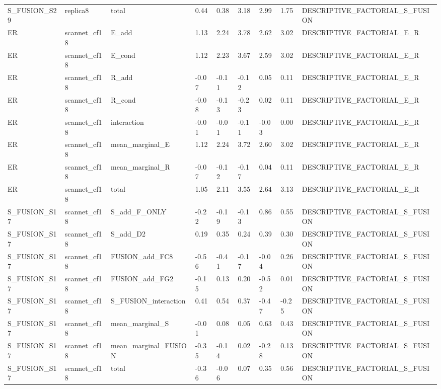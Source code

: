 \begin{tabular}{lllllllll}
S\_FUSION\_S29 & replica8 & total & 0.44 & 0.38 & 3.18 & 2.99 & 1.75 & DESCRIPTIVE\_FACTORIAL\_S\_FUSION \\
ER & scannet\_cf18 & E\_add & 1.13 & 2.24 & 3.78 & 2.62 & 3.02 & DESCRIPTIVE\_FACTORIAL\_E\_R \\
ER & scannet\_cf18 & E\_cond & 1.12 & 2.23 & 3.67 & 2.59 & 3.02 & DESCRIPTIVE\_FACTORIAL\_E\_R \\
ER & scannet\_cf18 & R\_add & -0.07 & -0.11 & -0.12 & 0.05 & 0.11 & DESCRIPTIVE\_FACTORIAL\_E\_R \\
ER & scannet\_cf18 & R\_cond & -0.08 & -0.13 & -0.23 & 0.02 & 0.11 & DESCRIPTIVE\_FACTORIAL\_E\_R \\
ER & scannet\_cf18 & interaction & -0.01 & -0.01 & -0.11 & -0.03 & 0.00 & DESCRIPTIVE\_FACTORIAL\_E\_R \\
ER & scannet\_cf18 & mean\_marginal\_E & 1.12 & 2.24 & 3.72 & 2.60 & 3.02 & DESCRIPTIVE\_FACTORIAL\_E\_R \\
ER & scannet\_cf18 & mean\_marginal\_R & -0.07 & -0.12 & -0.17 & 0.04 & 0.11 & DESCRIPTIVE\_FACTORIAL\_E\_R \\
ER & scannet\_cf18 & total & 1.05 & 2.11 & 3.55 & 2.64 & 3.13 & DESCRIPTIVE\_FACTORIAL\_E\_R \\
S\_FUSION\_S17 & scannet\_cf18 & S\_add\_F\_ONLY & -0.22 & -0.19 & -0.13 & 0.86 & 0.55 & DESCRIPTIVE\_FACTORIAL\_S\_FUSION \\
S\_FUSION\_S17 & scannet\_cf18 & S\_add\_D2 & 0.19 & 0.35 & 0.24 & 0.39 & 0.30 & DESCRIPTIVE\_FACTORIAL\_S\_FUSION \\
S\_FUSION\_S17 & scannet\_cf18 & FUSION\_add\_FC8 & -0.56 & -0.41 & -0.17 & -0.04 & 0.26 & DESCRIPTIVE\_FACTORIAL\_S\_FUSION \\
S\_FUSION\_S17 & scannet\_cf18 & FUSION\_add\_FG2 & -0.15 & 0.13 & 0.20 & -0.52 & 0.01 & DESCRIPTIVE\_FACTORIAL\_S\_FUSION \\
S\_FUSION\_S17 & scannet\_cf18 & S\_FUSION\_interaction & 0.41 & 0.54 & 0.37 & -0.47 & -0.25 & DESCRIPTIVE\_FACTORIAL\_S\_FUSION \\
S\_FUSION\_S17 & scannet\_cf18 & mean\_marginal\_S & -0.01 & 0.08 & 0.05 & 0.63 & 0.43 & DESCRIPTIVE\_FACTORIAL\_S\_FUSION \\
S\_FUSION\_S17 & scannet\_cf18 & mean\_marginal\_FUSION & -0.35 & -0.14 & 0.02 & -0.28 & 0.13 & DESCRIPTIVE\_FACTORIAL\_S\_FUSION \\
S\_FUSION\_S17 & scannet\_cf18 & total & -0.36 & -0.06 & 0.07 & 0.35 & 0.56 & DESCRIPTIVE\_FACTORIAL\_S\_FUSION \\

\end{tabular}
